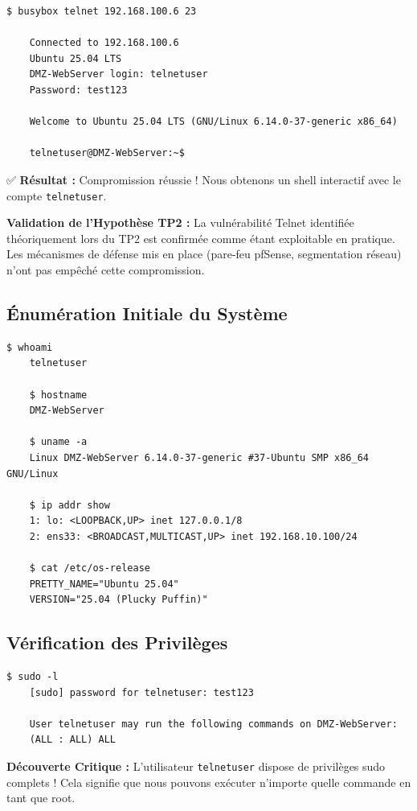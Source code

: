 \documentclass[12pt,a4paper,openany]{report}
\begin{document}
\begin{lstlisting}[caption=Accès Telnet Initial]
	$ busybox telnet 192.168.100.6 23
	
	Connected to 192.168.100.6
	Ubuntu 25.04 LTS
	DMZ-WebServer login: telnetuser
	Password: test123
	
	Welcome to Ubuntu 25.04 LTS (GNU/Linux 6.14.0-37-generic x86_64)
	
	telnetuser@DMZ-WebServer:~$
\end{lstlisting}

✅ \textbf{Résultat :} Compromission réussie ! Nous obtenons un shell interactif avec le compte \texttt{telnetuser}.

\textbf{Validation de l'Hypothèse TP2 :} La vulnérabilité Telnet identifiée théoriquement lors du TP2 est confirmée comme étant exploitable en pratique. Les mécanismes de défense mis en place (pare-feu pfSense, segmentation réseau) n'ont pas empêché cette compromission.

\subsection{Énumération Initiale du Système}

\begin{lstlisting}[caption=Collecte d'Informations Basiques]
	$ whoami
	telnetuser
	
	$ hostname
	DMZ-WebServer
	
	$ uname -a
	Linux DMZ-WebServer 6.14.0-37-generic #37-Ubuntu SMP x86_64 GNU/Linux
	
	$ ip addr show
	1: lo: <LOOPBACK,UP> inet 127.0.0.1/8
	2: ens33: <BROADCAST,MULTICAST,UP> inet 192.168.10.100/24
	
	$ cat /etc/os-release
	PRETTY_NAME="Ubuntu 25.04"
	VERSION="25.04 (Plucky Puffin)"
\end{lstlisting}

\subsection{Vérification des Privilèges}

\begin{lstlisting}[caption=Test des Permissions Sudo]
	$ sudo -l
	[sudo] password for telnetuser: test123
	
	User telnetuser may run the following commands on DMZ-WebServer:
	(ALL : ALL) ALL
\end{lstlisting}

\textbf{Découverte Critique :} L'utilisateur \texttt{telnetuser} dispose de privilèges sudo complets ! Cela signifie que nous pouvons exécuter n'importe quelle commande en tant que root.
\end{document}
